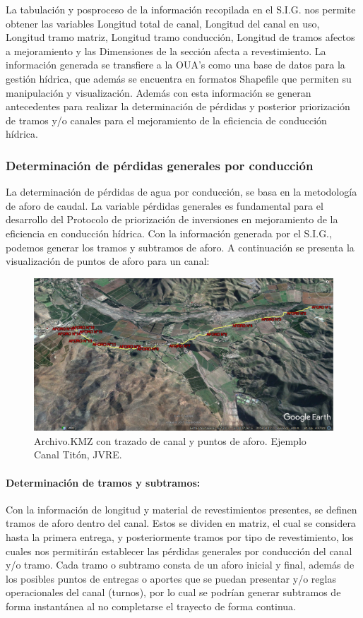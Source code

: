 \documentclass[]{article}
\begin{document}
La tabulación y posproceso de la información recopilada en el S.I.G. nos permite obtener las variables Longitud total de canal, Longitud del canal en uso, Longitud tramo matriz, Longitud tramo conducción, Longitud de tramos afectos a mejoramiento y las Dimensiones de la sección afecta a revestimiento. La información generada se transfiere a la OUA’s como una base de datos para la gestión hídrica, que además se encuentra en formatos Shapefile que permiten su manipulación y visualización. Además con esta información se generan antecedentes para realizar la determinación de pérdidas y posterior priorización de tramos y/o canales para el mejoramiento de la eficiencia de conducción hídrica.

\subsubsection{Determinación de pérdidas generales por conducción}

La determinación de pérdidas de agua por conducción, se basa en la metodología de aforo de caudal. La variable pérdidas generales es fundamental para el desarrollo del Protocolo de priorización de inversiones en mejoramiento de la eficiencia en conducción hídrica. Con la información generada por el S.I.G., podemos generar los tramos y subtramos de aforo. A continuación se presenta la visualización de puntos de aforo para un canal:

\begin{figure}[H]
\centering
\includegraphics[width=\textwidth]{images/puntos_de_aforo_kml2.eps}
\caption{Archivo.KMZ con trazado de canal y puntos de aforo. Ejemplo Canal Titón, JVRE.}
\label{kmz}
\end{figure}

\paragraph{Determinación de tramos y subtramos:} Con la información de longitud y material de revestimientos presentes, se definen tramos de aforo dentro del canal. Estos se dividen en matriz, el cual se considera hasta la primera entrega, y posteriormente tramos por tipo de revestimiento, los cuales nos permitirán establecer las pérdidas generales por conducción del canal y/o tramo. Cada tramo o subtramo consta de un aforo inicial y final, además de los posibles puntos de entregas o aportes que se puedan presentar y/o reglas operacionales del canal (turnos), por lo cual se podrían generar subtramos de forma instantánea al no completarse el trayecto de forma continua.
\end{document}

